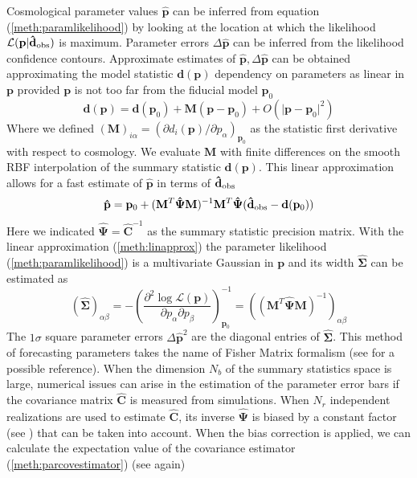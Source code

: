 \documentclass[reprint,aps,prd,superscriptaddress,showkeys,showpacs]{revtex4-1}
\newcommand{\bb}[1]{\mathbf{#1}}
\newcommand{\bbh}[1]{\mathbf{\hat{#1}}}
\begin{document}
%
Cosmological parameter values $\bbh{p}$ can be inferred from equation (\ref{meth:paramlikelihood}) by looking at the location at which the likelihood $\mathcal{L}(\bb{p}\vert\bbh{d}_{\rm obs})$ is maximum. Parameter errors $\Delta\bbh{p}$ can be inferred from the likelihood confidence contours. Approximate estimates of $\bbh{p},\Delta \bbh{p}$ can be obtained approximating the model statistic $\bb{d}(\bb{p})$ dependency on parameters as linear in $\bb{p}$ provided $\bb{p}$ is not too far from the fiducial model $\bb{p}_0$
\begin{equation}
\label{meth:linapprox}
\bb{d}(\bb{p}) = \bb{d}(\bb{p}_0) + \bb{M}(\bb{p}-\bb{p}_0) + O(\vert\bb{p}-\bb{p}_0\vert^2)
\end{equation} 
%
Where we defined $(\bb{M})_{i\alpha}=(\partial d_i(\bb{p})/\partial p_\alpha)_{\bb{p}_0}$ as the statistic first derivative with respect to cosmology. We evaluate $\bb{M}$ with finite differences on the smooth RBF interpolation of the summary statistic $\bb{d}(\bb{p})$. This linear approximation allows for a fast estimate of $\bbh{p}$ in terms of $\bbh{d}_{\rm obs}$
\begin{equation}
\label{meth:parestimate}
\bbh{p} = \bb{p}_0 + (\bb{M}^T\bbh{\Psi}\bb{M})^{-1}\bb{M}^T\bbh{\Psi}(\bbh{d}_{\rm obs}-\bb{d}(\bb{p}_0))
\end{equation}
%
Here we indicated $\bbh{\Psi}=\bbh{C}^{-1}$ as the summary statistic precision matrix. With the linear approximation (\ref{meth:linapprox}) the parameter likelihood (\ref{meth:paramlikelihood}) is a multivariate Gaussian in $\bb{p}$ and its width $\bbh{\Sigma}$ can be estimated as 
\begin{equation}
\label{meth:parcovestimator}
(\bbh{\Sigma})_{\alpha\beta} = -\left(\frac{\partial^2 \log \mathcal{L}(\bb{p})}{\partial p_\alpha \partial p_\beta}\right)^{-1}_{\bb{p}_0} = ((\bb{M}^T\bbh{\Psi}\bb{M})^{-1})_{\alpha\beta}
\end{equation}
%
The $1\sigma$ square parameter errors $\Delta \bbh{p}^2$ are the diagonal entries of $\bbh{\Sigma}$. This method of forecasting parameters takes the name of Fisher Matrix formalism (see \citep{astroMLText} for a possible reference). When the dimension $N_b$ of the summary statistics space is large, numerical issues can arise in the estimation of the parameter error bars if the covariance matrix $\bbh{C}$ is measured from simulations. When $N_r$ independent realizations are used to estimate $\bbh{C}$, its inverse $\bbh{\Psi}$ is biased by a constant factor (see \citep{Hartlap07,Taylor12,Taylor14}) that can be taken into account. When the bias correction is applied, we can calculate the expectation value of the covariance estimator (\ref{meth:parcovestimator}) (see again\citep{Taylor14})
\end{document}
